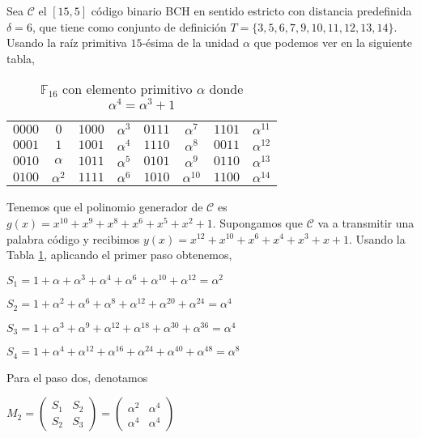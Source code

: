 \begin{exampleth}
\label{ex:algoritmo_pgz}
Sea $\mathcal{C}$ el $[15,5]$ código binario BCH en sentido estricto con distancia predefinida $\delta = 6 $, que tiene como conjunto de definición $T = \{ 3,5,6,7,9,10,11,12,13,14 \}$. Usando la  raíz primitiva $15$-ésima de la unidad $\alpha$ que podemos ver en la siguiente tabla,
\begin{table}[H]
\begin{tabular}{ c | c | c | c | c | c | c | c }

	 
$0000$ & $0$  & $1000$ & $\alpha^3$ & $0111$ & $\alpha^7$ & $1101$ & $\alpha^{11}$ \\$0001$ & $1$  & $1001$ & $\alpha^4$ & $1110$ & $\alpha^8$ & $0011$ & $\alpha^{12}$ \\
$0010$ & $\alpha$  & $1011$ & $\alpha^5$ & $0101$ & $\alpha^9$ & $0110$ & $\alpha^{13}$ \\
$0100$ & $\alpha^2$  & $1111$ & $\alpha^6$ & $1010$ & $\alpha^{10}$ & $1100$ & $\alpha^{14}$ \\
	\end{tabular}
\caption{\label{ta:seis} $\mathbb{F}_{16}$ con elemento primitivo $\alpha$ donde $\alpha^4 = \alpha^3 +1$}
\end{table}

Tenemos que el polinomio generador de $\mathcal{C}$ es $g(x) = x^{10}+x^9+x^8+x^6+x^5+x^2+1$.
Supongamos que $\mathcal{C}$ va a transmitir una palabra código y recibimos $y(x) = x^{12}+x^{10}+x^6+x^4+x^3+x+1$. Usando la Tabla \ref{ta:seis}, aplicando el primer paso obtenemos,

$S_1 = 1 + \alpha + \alpha^3 + \alpha^4 + \alpha^6 + \alpha^{10} + \alpha^{12} = \alpha^2$  

$S_2 =  1 + \alpha^2 + \alpha^6 + \alpha^8 + \alpha^{12} + \alpha^{20} + \alpha^{24} = \alpha^{4}$

$S_3 = 1 + \alpha^3 + \alpha^{9} + \alpha^{12} + \alpha^{18} + \alpha^{30} + \alpha^{36} = \alpha^{4}$

$S_4 = 1 + \alpha^4 + \alpha^{12} + \alpha^{16} + \alpha^{24} + \alpha^{40} + \alpha^{48} = \alpha^8$

Para el paso dos, denotamos

$M_2 = \begin{pmatrix}
			S_1 & S_2  \\
			S_2 & S_3
	\end{pmatrix} = \begin{pmatrix}
			\alpha^2 & \alpha^4  \\
			\alpha^4 & \alpha^4
	\end{pmatrix}$


\end{exampleth}
